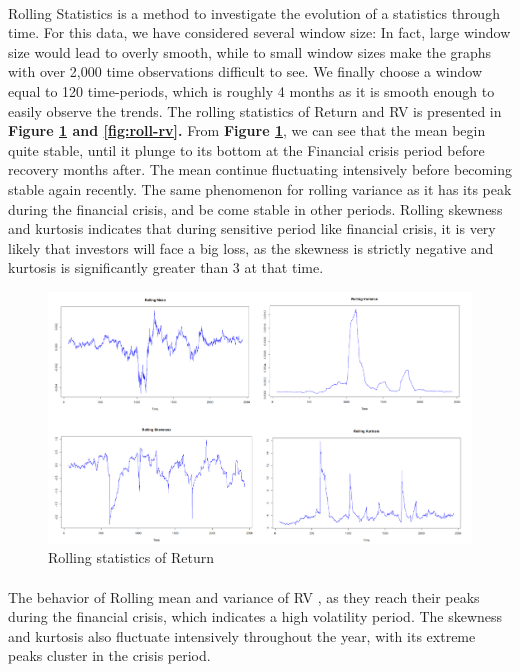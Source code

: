 \documentclass[a4paper]{article}
\begin{document}
\paragraph{}
Rolling Statistics is a method to investigate the evolution of a statistics through time. For this data, we have considered several window size: In fact, large window size would lead to overly smooth, while to small window sizes make the graphs with over 2,000 time observations difficult to see. We finally choose a window equal to 120 time-periods, which is roughly 4 months as it is smooth enough to easily observe the trends. The rolling statistics of Return and RV is presented in \textbf{Figure \ref{fig:roll-ret} and \ref{fig:roll-rv}.} From \textbf{Figure \ref{fig:roll-ret}}, we can see that the mean begin quite stable, until it plunge to its bottom at the Financial crisis period before recovery months after. The mean continue fluctuating intensively before becoming stable again recently. The same phenomenon for rolling variance as it has its peak during the financial crisis, and be come stable in other periods. Rolling skewness and kurtosis indicates that during sensitive period like financial crisis, it is very likely that investors will face a big loss, as the skewness is strictly negative and kurtosis is significantly greater than 3 at that time.

\begin{figure}[H]
\centering
\includegraphics[width=1.05\textwidth]{rolling_return.png}
\caption{\label{fig:roll-ret}Rolling statistics of Return}
\end{figure}

\paragraph{}
The behavior of Rolling mean and variance of RV , as they reach their peaks during the financial crisis, which indicates a high volatility period. The skewness and kurtosis also fluctuate intensively throughout the year, with its extreme peaks cluster in the crisis period.
\end{document}
